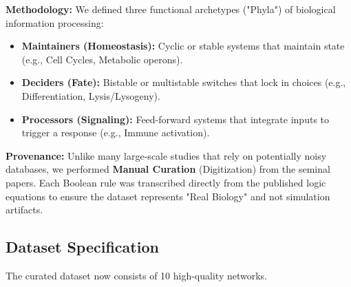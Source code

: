 \documentclass{article}
\begin{document}
\textbf{Methodology:}
We defined three functional archetypes ("Phyla") of biological information processing:
\begin{itemize}
    \item \textbf{Maintainers (Homeostasis):} Cyclic or stable systems that maintain state (e.g., Cell Cycles, Metabolic operons).
    \item \textbf{Deciders (Fate):} Bistable or multistable switches that lock in choices (e.g., Differentiation, Lysis/Lysogeny).
    \item \textbf{Processors (Signaling):} Feed-forward systems that integrate inputs to trigger a response (e.g., Immune activation).
\end{itemize}

\textbf{Provenance:}
Unlike many large-scale studies that rely on potentially noisy databases, we performed \textbf{Manual Curation} (Digitization) from the seminal papers. Each Boolean rule was transcribed directly from the published logic equations to ensure the dataset represents "Real Biology" and not simulation artifacts.

\subsection{Dataset Specification}
The curated dataset now consists of 10 high-quality networks.
\end{document}

